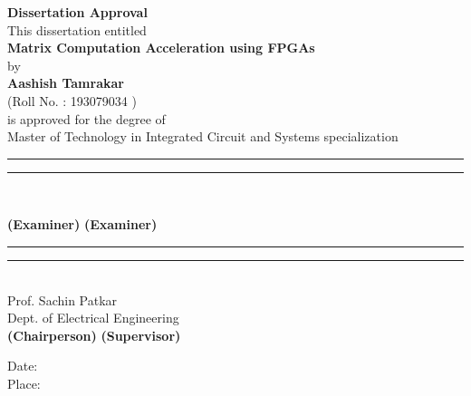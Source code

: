 \begin{Approval}
\noindent

\begin{center}
    {\Large \textbf{Dissertation Approval}}\\
\vspace{10 mm}
This dissertation entitled \\
\vspace{5 mm}
{\large \textbf{Matrix Computation Acceleration using FPGAs}} \\
\vspace{5 mm}
by \\
\vspace{5 mm}
\textbf{Aashish Tamrakar} \\
(Roll No. : 193079034 ) \\
\vspace{7 mm}
is approved for the degree of \\
Master of Technology in Integrated Circuit and Systems specialization
\end{center}

\vspace{50 mm}

\hspace{2 cm}\rule{4cm}{0.4pt}
\hspace{4 cm}
\rule{4cm}{0.4pt} \\
\vspace{1 cm}

\hspace{2.75 cm}\textbf{(Examiner)}
\hspace{5.5 cm}
\textbf{(Examiner)} \\
\vspace{1 cm}

\hspace{2 cm}\rule{4cm}{0.4pt}
\hspace{4 cm}
\rule{4cm}{0.4pt} \\

\vspace{-5 mm}
\hspace{105 mm}Prof. Sachin Patkar \\
\vspace{5 mm}
\hspace{95 mm} Dept. of Electrical Engineering\\

\vspace{-10 mm}
\hspace{2.75 cm}\textbf{(Chairperson)}
\hspace{5.5 cm}
\textbf{(Supervisor)} \\
\vspace{10 mm}



\begin{flushleft}
Date:\\
Place:\\
\end{flushleft}

\end{Approval}